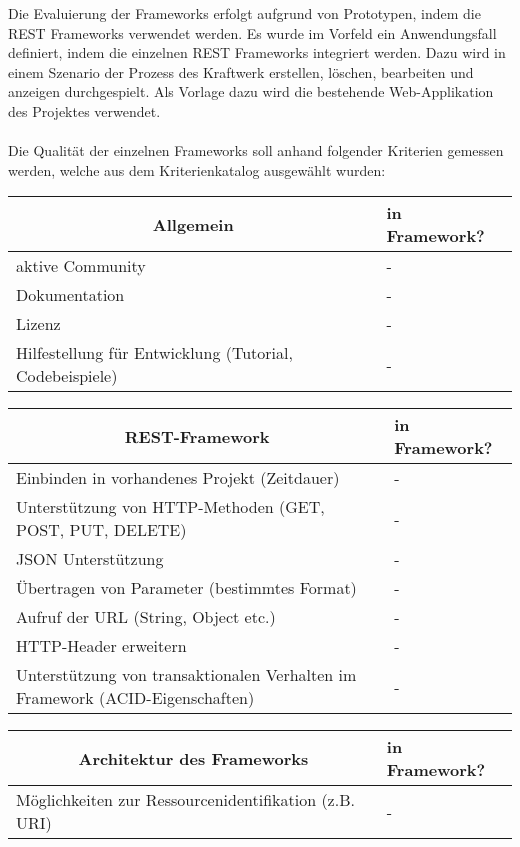 \documentclass[a4paper,11pt,german,public]{INSOexpose}
\begin{document}
Die Evaluierung der Frameworks erfolgt aufgrund von Prototypen, indem die REST Frameworks verwendet werden. Es wurde im Vorfeld ein Anwendungsfall definiert, indem die einzelnen REST Frameworks  integriert werden. Dazu wird in einem Szenario der Prozess des Kraftwerk erstellen, löschen, bearbeiten und anzeigen durchgespielt. Als Vorlage dazu wird die bestehende Web-Applikation des Projektes verwendet.
\\\\
Die Qualität der einzelnen Frameworks soll anhand folgender Kriterien gemessen werden, welche aus dem Kriterienkatalog\cite{vergleich13} ausgewählt wurden:
\begin{spacing}{1.4}
\begin{longtable}{|p{.7 \linewidth}|p{.2 \linewidth}|}
	\hline
	\multicolumn{1}{|c|}{\textbf{Allgemein}} & \textbf{in Framework?} \\ 
	\hline \hline 
	aktive Community & - \\ 
	\hline
	Dokumentation & - \\ 
	\hline
	Lizenz & - \\
	\hline
	Hilfestellung für Entwicklung (Tutorial, Codebeispiele) & - \\
	\hline
\end{longtable}
\begin{longtable}{|p{.7 \linewidth}|p{.2 \linewidth}|}
	\hline
	\multicolumn{1}{|c|}{\textbf{REST-Framework}} & \textbf{in Framework?} \\ 
	\hline \hline 
	Einbinden in vorhandenes Projekt (Zeitdauer) & - \\
	\hline
	Unterstützung von HTTP-Methoden \newline (GET, POST, PUT, DELETE) & - \\
	\hline 
	JSON Unterstützung & - \\
	\hline
	Übertragen von Parameter (bestimmtes Format) & - \\
	\hline
	Aufruf der URL (String, Object etc.) & - \\
	\hline
	HTTP-Header erweitern & - \\
	\hline
	Unterstützung von transaktionalen Verhalten im Framework (ACID-Eigenschaften)  & - \\
	\hline
\end{longtable}
\begin{longtable}{|p{.7 \linewidth}|p{.2 \linewidth}|}
	\hline
	\multicolumn{1}{|c|}{\textbf{Architektur des Frameworks}} & \textbf{in Framework?} \\ 
	\hline \hline 
	Möglichkeiten zur Ressourcenidentifikation (z.B. URI) & - \\

\end{longtable}
\end{spacing}
\end{document}
